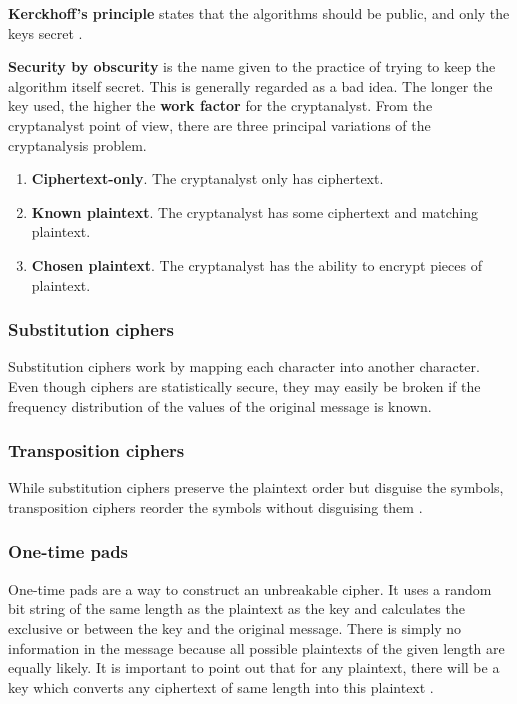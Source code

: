 \documentclass[12pt, oneside]{book}
\begin{document}
\textbf{Kerckhoff's principle} states that the algorithms should be public, and only the keys secret \cite[p.~768]{computer-networks-tanenbaum-2012}.

\textbf{Security by obscurity} is the name given to the practice of trying to keep the algorithm itself secret.
This is generally regarded as a bad idea. The longer the key used, the higher the \textbf{work factor} for the cryptanalyst.
From the cryptanalyst point of view, there are three principal variations of the cryptanalysis problem.

\begin{enumerate}
    \item \textbf{Ciphertext-only}. The cryptanalyst only has ciphertext.
    \item \textbf{Known plaintext}. The cryptanalyst has some ciphertext and matching plaintext.
    \item \textbf{Chosen plaintext}. The cryptanalyst has the ability to encrypt pieces of plaintext.
\end{enumerate}

\subsubsection{Substitution ciphers}

Substitution ciphers work by mapping each character into another character.
Even though ciphers are statistically secure, they may easily be broken if the frequency distribution of the values of the original message is known.

\subsubsection{Transposition ciphers}

While substitution ciphers preserve the plaintext order but disguise the symbols, transposition ciphers reorder the symbols without disguising them \cite[p.~771]{computer-networks-tanenbaum-2012}.

\subsubsection{One-time pads}

One-time pads are a way to construct an unbreakable cipher.
It uses a random bit string of the same length as the plaintext as the key and calculates the exclusive or between the key and the original message.
There is simply no information in the message because all possible plaintexts of the given length are equally likely.
It is important to point out that for any plaintext, there will be a key which converts any ciphertext of same length into this plaintext \cite[p.~772]{computer-networks-tanenbaum-2012}.
\end{document}
